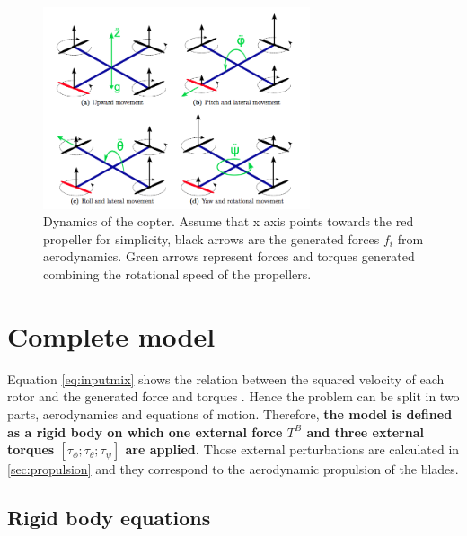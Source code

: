 \begin{figure}[h]
\centering
 \includegraphics[width=0.7\textwidth]{forces.png}
 \caption[Quad dynamics]{Dynamics of the copter. Assume that x axis points towards the red propeller for simplicity, black arrows are the generated forces $f_i$ from aerodynamics. Green arrows represent forces and torques generated combining the rotational speed of the propellers.}
 \label{figure:forces}
\end{figure}


\section{Complete model}

Equation \eqref{eq:inputmix} shows the relation between the squared velocity of each rotor and the generated force and torques  . Hence the problem can be split in two parts, aerodynamics and equations of motion. Therefore, \textbf{the model is defined as a rigid body on which one external force $T^B$ and three external torques $[\tau_\phi ; \tau_\theta ; \tau_\psi]$ are applied.} Those external perturbations are calculated in \ref{sec:propulsion} and they correspond to the aerodynamic propulsion of the blades. 

\subsection{Rigid body equations}

